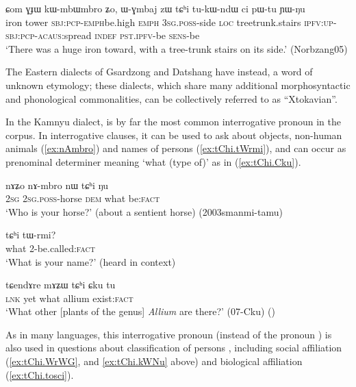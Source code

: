 \begin{exe}
\ex \label{ex:tChi.tukWndW}
\gll ɕom ɣɟɯ kɯ-mbɯ\redp{}mbro ʑo,  ɯ-ɣmbaj zɯ tɕʰi tu-kɯ-ndɯ ci pɯ-tu ɲɯ-ŋu \\
iron tower \textsc{sbj}:\textsc{pcp}-\textsc{emph}\redp{}be.high \textsc{emph} \textsc{3sg}.\textsc{poss}-side \textsc{loc} treetrunk.stairs \textsc{ipfv}:\textsc{up}-\textsc{sbj}:\textsc{pcp}-\textsc{acaus}:spread \textsc{indef} \textsc{pst}.\textsc{ipfv}-be \textsc{sens}-be \\
\glt `There was a huge iron toward, with a tree-trunk stairs on its side.' (Norbzang05)
\end{exe}  

The Eastern dialects of Gsardzong and Datshang have  instead, a word of unknown etymology; these dialects, which share many additional morphosyntactic and phonological commonalities, can be collectively referred to as ``Xtokavian''.

In the Kamnyu dialect,  is by far the most common interrogative pronoun in the corpus. In interrogative clauses, it can be used to ask about objects, non-human animals (\ref{ex:nAmbro}) and names of persons (\ref{ex:tChi.tWrmi}), and can occur as prenominal determiner meaning `what (type of)' as in (\ref{ex:tChi.Cku}).

\begin{exe}
\ex \label{ex:nAmbro}
\gll nɤʑo nɤ-mbro nɯ tɕʰi ŋu \\
\textsc{2sg} \textsc{2sg}.\textsc{poss}-horse \textsc{dem} what be:\textsc{fact} \\
\glt `Who is your horse?' (about a sentient horse) (2003smanmi-tamu)
\end{exe}  

\begin{exe}
\ex \label{ex:tChi.tWrmi}
\gll tɕʰi tɯ-rmi? \\
what 2-be.called:\textsc{fact} \\
\glt `What is your name?' (heard in context)
\end{exe}    

\begin{exe}
\ex \label{ex:tChi.Cku}
\gll  tɕendɤre mɤʑɯ tɕʰi ɕku tu \\
\textsc{lnk} yet what allium exist:\textsc{fact} \\
\glt `What other [plants of the genus] \textit{Allium} are there?' (07-Cku)
()
\end{exe}   

As in many languages, this interrogative pronoun (instead of the pronoun ) is also used in questions about classification of persons \citep{idiatov07nonselective}, including social affiliation (\ref{ex:tChi.WrWG}, and \ref{ex:tChi.kWNu} above) and biological affiliation (\ref{ex:tChi.tosci}).

